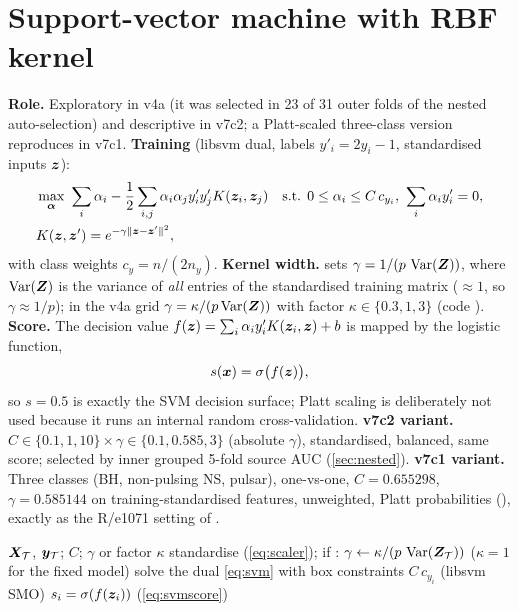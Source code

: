 \section{Support-vector machine with RBF kernel}\label{sec:svm}
\textbf{Role.} Exploratory in v4a (it was selected in 23 of 31 outer folds of the nested auto-selection) and descriptive
in v7c2; a Platt-scaled three-class version reproduces \citet{deBeurs2022} in v7c1. \textbf{Training} (libsvm dual, labels
$y'_i=2y_i-1$, standardised inputs $\bm{z}$):
\begin{equation}
\begin{split}
&\max_{\vect\alpha}\ \sum_i\alpha_i-\frac12\sum_{i,j}\alpha_i\alpha_jy'_iy'_jK(\vect z_i,\vect z_j)\quad
\text{s.t. } 0\le\alpha_i\le C\,c_{y_i},\ \sum_i\alpha_iy'_i=0,\\
&K(\vect z,\vect z')=e^{-\gamma\|\vect z-\vect z'\|^2},
\end{split}\label{eq:svm}
\end{equation}
with class weights $c_y = n/(2n_y)$. \textbf{Kernel width.}  sets $\gamma = 1/(p\,\operatorname{Var}(\bm{Z}))$,
where $\operatorname{Var}(\bm{Z})$ is the variance of \emph{all} entries of the standardised training matrix ($\approx1$, so
$\gamma\approx1/p$); in the v4a grid $\gamma = \kappa/(p\operatorname{Var}(\bm{Z}))$ with factor $\kappa\in\{0.3,1,3\}$ (code
). \textbf{Score.} The decision value $f(\bm{z})=\sum_i\alpha_iy'_iK(\bm{z}_i,\bm{z})+b$ is mapped by
the logistic function,
\begin{equation}
s(\bm{x}) = \sigma\bigl(f(\bm{z})\bigr),\label{eq:svmscore}
\end{equation}
so $s=0.5$ is exactly the SVM decision surface; Platt scaling is deliberately not used because it runs an internal random
cross-validation. \textbf{v7c2 variant.} $C\in\{0.1,1,10\}\times\gamma\in\{0.1,0.585,3\}$ (absolute $\gamma$),
standardised, balanced, same score; selected by inner grouped 5-fold source AUC (\cref{sec:nested}).
\textbf{v7c1 variant.} Three classes (BH, non-pulsing NS, pulsar), one-vs-one, $C=0.655298$, $\gamma=0.585144$ on
training-standardised features, unweighted, Platt probabilities (), exactly as
the R/e1071 setting of \citet{deBeurs2022}.

\begin{algorithm}[htbp]
\caption{RBF-SVM fit and score (binary versions)}\label{alg:svm}
\begin{algorithmic}[1]
\Require $\bm{X}_\mathcal T$, $\bm{y}_\mathcal T$; $C$; $\gamma$ or factor $\kappa$
\State standardise (\cref{eq:scaler}); if : $\gamma\gets\kappa/(p\,\operatorname{Var}(\bm{Z}_\mathcal T))$ ($\kappa=1$ for the fixed model)
\State solve the dual \cref{eq:svm} with box constraints $C\,c_{y_i}$ (libsvm SMO)
\State \Return $s_i=\sigma(f(\bm{z}_i))$ (\cref{eq:svmscore})
\end{algorithmic}
\end{algorithm}

